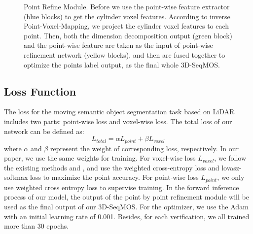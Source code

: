 \documentclass[lettersize,journal]{IEEEtran}
\begin{document}
\begin{figure}[h]
\centering
\vskip 0.2in
\caption{Point Refine Module. Before we use the point-wise feature extractor (blue blocks) to get the cylinder voxel features. According to inverse Point-Voxel-Mapping, we project the cylinder voxel features to each point. Then, both the dimension decomposition output (green block) and the point-wise feature are taken as the input of point-wise refinement network (yellow blocks), and then are fused together to optimize the points label output, as the final whole 3D-SeqMOS.}
\label{fig.refine}
\end{figure}


\subsection{Loss Function}
The loss for the moving semantic object segmentation task based on LiDAR includes two parts: point-wise loss and voxel-wise loss. The total loss of our network can be defined as:
\begin{equation}
    L_{total} = \alpha L_{point} + \beta L_{voxel}
\label{loss}
\end{equation}
where $\alpha$  and $\beta$ represent the weight of corresponding loss, respectively. In our paper, we use the same weights for training. For voxel-wise loss $L_{voxel}$, we follow the existing methods \cite{hu2020randla} and  \cite{cortinhal2020salsanext}, and use the weighted cross-entropy loss and lovasz-softmax \cite{berman2018lovasz} loss to maximize the point accuracy. For point-wise loss $L_{point}$, we only use weighted cross entropy loss to supervise training. In the forward inference process of our model, the output of the point by point refinement module will be used as the final output of our 3D-SeqMOS. For the optimizer, we use the Adam with an initial learning rate of 0.001. Besides, for each verification, we all trained more than 30 epochs.
\end{document}
